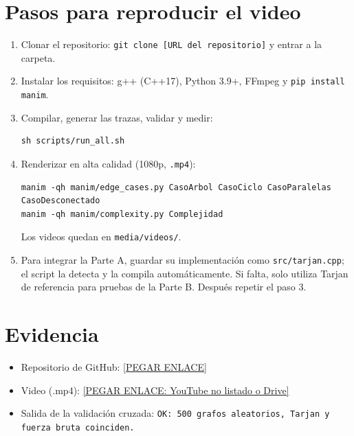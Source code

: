 \documentclass[11pt,a4paper]{article}
\begin{document}
\section{Pasos para reproducir el video}
\begin{enumerate}
\item Clonar el repositorio: \texttt{git clone [URL del repositorio]} y entrar a la carpeta.
\item Instalar los requisitos: g++ (C++17), Python 3.9+, FFmpeg y \texttt{pip install manim}.
\item Compilar, generar las trazas, validar y medir:
\begin{lstlisting}
sh scripts/run_all.sh
\end{lstlisting}
\item Renderizar en alta calidad (1080p, \texttt{.mp4}):
\begin{lstlisting}
manim -qh manim/edge_cases.py CasoArbol CasoCiclo CasoParalelas CasoDesconectado
manim -qh manim/complexity.py Complejidad
\end{lstlisting}
Los videos quedan en \texttt{media/videos/}.
\item Para integrar la Parte A, guardar su implementación como \texttt{src/tarjan.cpp}; el script la detecta y la compila automáticamente. Si falta, solo utiliza Tarjan de referencia para pruebas de la Parte B. Después repetir el paso 3.
\end{enumerate}

\section{Evidencia}
\begin{itemize}
\item Repositorio de GitHub: \url{[PEGAR ENLACE]}
\item Video (.mp4): \url{[PEGAR ENLACE: YouTube no listado o Drive]}
\item Salida de la validación cruzada: \texttt{OK: 500 grafos aleatorios, Tarjan y fuerza bruta coinciden.}
\end{itemize}
\begin{center}
\\[0.3cm]
\\[0.3cm]
\end{center}
\end{document}
